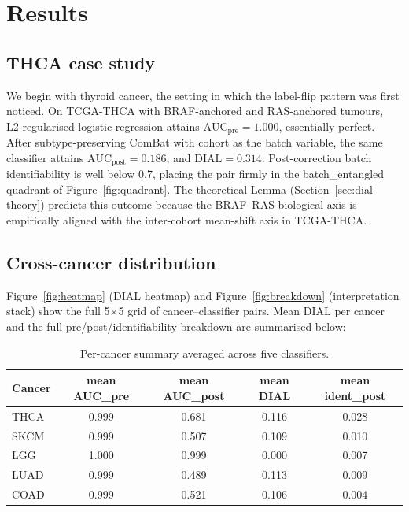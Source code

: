 \documentclass[11pt]{article}
\begin{document}
\section{Results}

\subsection{THCA case study}

We begin with thyroid cancer, the setting in which the label-flip pattern was first noticed. On TCGA-THCA with BRAF-anchored and RAS-anchored tumours, L2-regularised logistic regression attains $\mathrm{AUC}_{\mathrm{pre}} = 1.000$, essentially perfect. After subtype-preserving ComBat with cohort as the batch variable, the same classifier attains $\mathrm{AUC}_{\mathrm{post}} = 0.186$, and $\mathrm{DIAL} = 0.314$. Post-correction batch identifiability is well below 0.7, placing the pair firmly in the batch\_entangled quadrant of Figure~\ref{fig:quadrant}. The theoretical Lemma (Section~\ref{sec:dial-theory}) predicts this outcome because the BRAF--RAS biological axis is empirically aligned with the inter-cohort mean-shift axis in TCGA-THCA.

\subsection{Cross-cancer distribution}

Figure~\ref{fig:heatmap} (DIAL heatmap) and Figure~\ref{fig:breakdown} (interpretation stack) show the full 5$\times$5 grid of cancer--classifier pairs. Mean DIAL per cancer and the full pre/post/identifiability breakdown are summarised below:

\begin{table}[h]
\centering\small
\begin{tabular}{lcccc}
\toprule
Cancer & mean AUC\_pre & mean AUC\_post & mean DIAL & mean ident\_post \\
\midrule
THCA & 0.999 & 0.681 & 0.116 & 0.028 \\
SKCM & 0.999 & 0.507 & 0.109 & 0.010 \\
LGG & 1.000 & 0.999 & 0.000 & 0.007 \\
LUAD & 0.999 & 0.489 & 0.113 & 0.009 \\
COAD & 0.999 & 0.521 & 0.106 & 0.004 \\
\bottomrule
\end{tabular}
\caption{Per-cancer summary averaged across five classifiers.}
\end{table}
\end{document}
